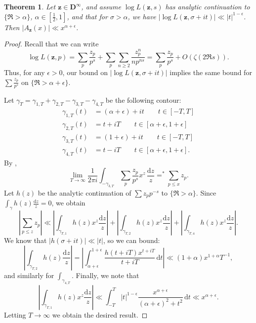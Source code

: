 \documentclass{article}
\newcommand{\bD}{\mathbf{D}}
\newcommand{\bz}{{\boldsymbol z}}
\newcommand{\dd}{\mathrm{d}}
\newtheorem{theorem}[subsection]{Theorem}
\theoremstyle{definition}
\begin{document}
\begin{theorem}
Let $\bz\in \bD^\infty$, and assume $\log L(\bz,s)$ has analytic continuation 
to $\{\Re >\alpha\}$, $\alpha\in [\frac 1 2,1]$, and that for $\sigma>\alpha$, 
we have $|\log L(\bz,\sigma+i t)| \ll |t|^{1-\epsilon}$. Then 
$|A_\bz(x)| \ll x^{\alpha+\epsilon}$. 
\end{theorem}
\begin{proof}
Recall that we can write 
\[
	\log L(\bz,p) = \sum_p \frac{z_p}{p^s} + \sum_p \sum_{n\geqslant 2} \frac{z_p^n}{n p^{n s}} = \sum_p \frac{z_p}{p^s} + O(\zeta(2\Re s)).
\]
Thus, for any $\epsilon>0$, our bound on $|\log L(\bz,\sigma+i t)|$ implies the 
same bound for $\sum \frac{z_p}{p^s}$ on $\{\Re >\alpha+\epsilon\}$. 

Let $\gamma_T=\gamma_{1,T}+\gamma_{2,T}-\gamma_{3,T}-\gamma_{4,T}$ be the 
following contour:
\begin{align*}
	\gamma_{1,T}(t) &= (\alpha+\epsilon)+i t\qquad t\in [-T,T] \\
	\gamma_{2,T}(t) &= t+i T \qquad t\in [\alpha+\epsilon,1+\epsilon] \\
	\gamma_{3,T}(t) &= (1+\epsilon) + i t \qquad t\in [-T,T] \\
	\gamma_{4,T}(t) &= t - i T \qquad t\in [\alpha+\epsilon,1+\epsilon] .
\end{align*}
By \cite[Th.11.18]{apostol-1976}, 
\[
	\lim_{T\to \infty} \frac{1}{2\pi i} \int_{-\gamma_{3,T}} \sum_p \frac{z_p}{p^s} x^z\, \frac{\dd z}{z} =^\ast \sum_{p\leqslant x} z_p .
\]
Let $h(z)$ be the analytic continuation of $\sum z_p p^{-s}$ to 
$\{\Re >\alpha\}$. Since $\int_\gamma h(z) \frac{\dd z}{z} = 0$, we obtain
\[
	\left| \sum_{p\leqslant z} z_p\right| \ll \left|\int_{\gamma_{T,1}}h(z)x^z\frac{\dd z}{z}\right| + \left|\int_{\gamma_{T,2}}h(z)x^z\frac{\dd z}{z}\right| + \left|\int_{\gamma_{T,4}}h(z)x^z\frac{\dd z}{z}\right| .
\]
We know that $|h(\sigma+ i t)| \ll |t|$, so we can bound:
\[
	\left|\int_{\gamma_{T,2}}h(z)\frac{\dd z}{z}\right|
		= \left| \int_{\alpha+\epsilon}^{1+\epsilon} \frac{h(t+i T)x^{t+i T}}{t+i T}\, \dd t\right| 
		\ll (1+\alpha)x^{1+\alpha} T^{-1} ,
\]
and similarly for $\int_{\gamma_{4,T}}$. Finally, we note that 
\[
	\left|\int_{\gamma_{T,1}}h(z)x^z\frac{\dd z}{z}\right| \ll \int_{-T}^T |t|^{1-\epsilon} \frac{x^{\alpha+\epsilon}}{(\alpha+\epsilon)^2+t^2}\, \dd t \ll x^{\alpha+\epsilon} .
\]
Letting $T\to \infty$ we obtain the desired result.
\end{proof}
\end{document}
